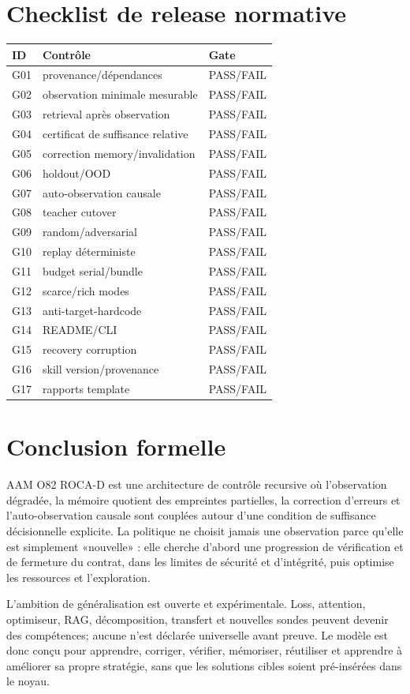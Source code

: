 \documentclass[11pt,a4paper]{report}
\begin{document}
\chapter{Checklist de release normative}
\begin{longtable}{p{}p{}p{}}
\toprule ID & Contrôle & Gate \\ \midrule
G01 & provenance/dépendances & PASS/FAIL \\
G02 & observation minimale mesurable & PASS/FAIL \\
G03 & retrieval après observation & PASS/FAIL \\
G04 & certificat de suffisance relative & PASS/FAIL \\
G05 & correction memory/invalidation & PASS/FAIL \\
G06 & holdout/OOD & PASS/FAIL \\
G07 & auto-observation causale & PASS/FAIL \\
G08 & teacher cutover & PASS/FAIL \\
G09 & random/adversarial & PASS/FAIL \\
G10 & replay déterministe & PASS/FAIL \\
G11 & budget serial/bundle & PASS/FAIL \\
G12 & scarce/rich modes & PASS/FAIL \\
G13 & anti-target-hardcode & PASS/FAIL \\
G14 & README/CLI & PASS/FAIL \\
G15 & recovery corruption & PASS/FAIL \\
G16 & skill version/provenance & PASS/FAIL \\
G17 & rapports template & PASS/FAIL \\
\bottomrule
\end{longtable}

\chapter{Conclusion formelle}
AAM O82 ROCA-D est une architecture de contrôle recursive où l'observation dégradée, la mémoire quotient des empreintes partielles, la correction d'erreurs et l'auto-observation causale sont couplées autour d'une condition de suffisance décisionnelle explicite. La politique ne choisit jamais une observation parce qu'elle est simplement «nouvelle» : elle cherche d'abord une progression de vérification et de fermeture du contrat, dans les limites de sécurité et d'intégrité, puis optimise les ressources et l'exploration.

L'ambition de généralisation est ouverte et expérimentale. Loss, attention, optimiseur, RAG, décomposition, transfert et nouvelles sondes peuvent devenir des compétences; aucune n'est déclarée universelle avant preuve. Le modèle est donc conçu pour apprendre, corriger, vérifier, mémoriser, réutiliser et apprendre à améliorer sa propre stratégie, sans que les solutions cibles soient pré-insérées dans le noyau.
\end{document}
